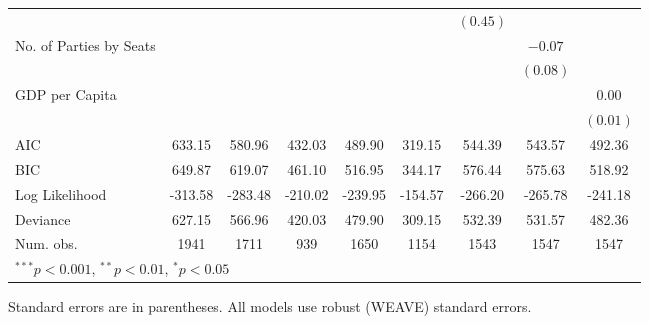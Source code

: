 \documentclass[a4paper]{article}\usepackage[]{graphicx}\usepackage[]{color}
\begin{document}
\begin{table}
\begin{center}
{\begin{tabular}{l c c c c c c c c }
                        &               &               &              &               &               & $(0.45)$      &               &               \\
No. of Parties by Seats &               &               &              &               &               &               & $-0.07$       &               \\
                        &               &               &              &               &               &               & $(0.08)$      &               \\
GDP per Capita          &               &               &              &               &               &               &               & $0.00$        \\
                        &               &               &              &               &               &               &               & $(0.01)$      \\
\hline
AIC                     & 633.15        & 580.96        & 432.03       & 489.90        & 319.15        & 544.39        & 543.57        & 492.36        \\
BIC                     & 649.87        & 619.07        & 461.10       & 516.95        & 344.17        & 576.44        & 575.63        & 518.92        \\
Log Likelihood          & -313.58       & -283.48       & -210.02      & -239.95       & -154.57       & -266.20       & -265.78       & -241.18       \\
Deviance                & 627.15        & 566.96        & 420.03       & 479.90        & 309.15        & 532.39        & 531.57        & 482.36        \\
Num. obs.               & 1941          & 1711          & 939          & 1650          & 1154          & 1543          & 1547          & 1547          \\
\hline
\multicolumn{9}{l}{\scriptsize{$^{***}p<0.001$, $^{**}p<0.01$, $^*p<0.05$}}
\end{tabular}

}
\end{center}
{\scriptsize{
    Standard errors are in parentheses. All models use robust (WEAVE) standard errors. \\
}}
\end{table}
\end{document}
